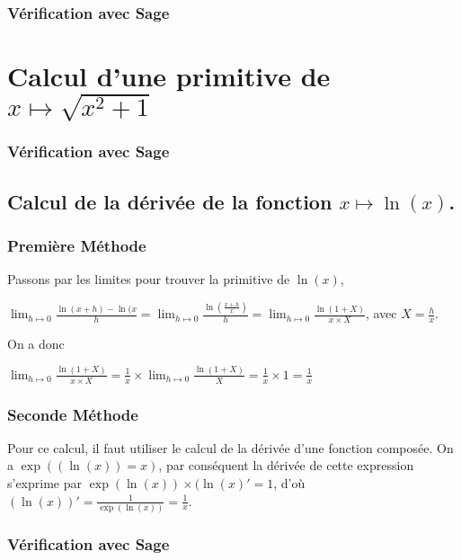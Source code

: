 \documentclass[a4paper,14pt]{extreport} %
\begin{document}
\subsubsection{Vérification avec Sage}

\section{Calcul d'une primitive de $  x \longmapsto  \sqrt{x^2 + 1}  $ \label{sqrt-001} }

\subsubsection{Vérification avec Sage}



\subsection{Calcul de la dérivée de la fonction $x \mapsto \ln(x) $.}


\subsubsection{Première Méthode}


Passons par les limites pour trouver la primitive de $\ln(x)$,

$ \lim_{h \mapsto 0} \frac{\ln(x+h) - \ln(x}{h} = \lim_{h \mapsto 0} \frac{\ln(\frac{x+h}{x})}{h}  = \lim_{h \mapsto 0} \frac{ \ln(1+X)}{x\times X}$, avec $X=\frac{h}{x}$.


On a donc 

$\lim_{h \mapsto 0} \frac{\ln(1+X)}{x\times X} = \frac{1}{x} \times \lim_{h \mapsto 0} \frac{\ln(1+X)}{X} = \frac{1}{x} \times 1 = \frac{1}{x}$




\subsubsection{Seconde Méthode}

Pour ce calcul, il faut utiliser le calcul de la dérivée d'une fonction composée. On a $\exp((\ln(x))=x)$, par conséquent la dérivée de cette expression s'exprime par $ \exp(\ln(x)) \times (\ln(x)' = 1$, d'où $(\ln(x))' = \frac{1}{\exp(\ln(x))}  = \frac{1}{x} $.

\subsubsection{Vérification avec Sage}
\end{document}
